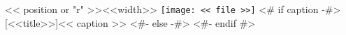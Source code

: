 \begin{wrapfigure}{<< position or "r" >>}{<<width>>}
  \vspace{-1em}
  \centering\texttt{[image: << file >>]}
  <# if caption -#>
  [<<title>>]{<< caption >>}
  <#- else -#>
  <#- endif #>\label{fig:<< id >>}
  \vspace{-1em}
\end{wrapfigure}
